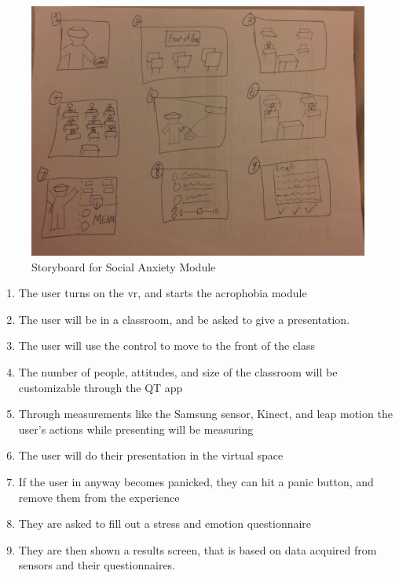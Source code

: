 \documentclass[a4paper,10pt]{article}
\begin{document}
\begin{figure}[H] %
	\centerline {\includegraphics[scale = 0.12, angle = 180]{sbPresent.jpg}}
	\caption{Storyboard for Social Anxiety Module}
	\label{fig:sbPresent}
\end{figure}
\begin{enumerate}
	\item The user turns on the vr, and starts the acrophobia module
	\item The user will be in a classroom, and be asked to give a presentation.
	\item The user will use the control to move to the front of the class
	\item The number of people, attitudes, and size of the classroom will be customizable through the QT app
	\item Through measurements like the Samsung sensor, Kinect, and leap motion the user's actions while presenting will be measuring
	\item The user will do their presentation in the virtual space
	\item If the user in anyway becomes panicked, they can hit a panic button, and remove them from the experience
	\item They are asked to fill out a stress and emotion questionnaire
	\item They are then shown a results screen, that is based on data acquired from sensors and their questionnaires.
\end{enumerate}
\pagebreak
\end{document}
